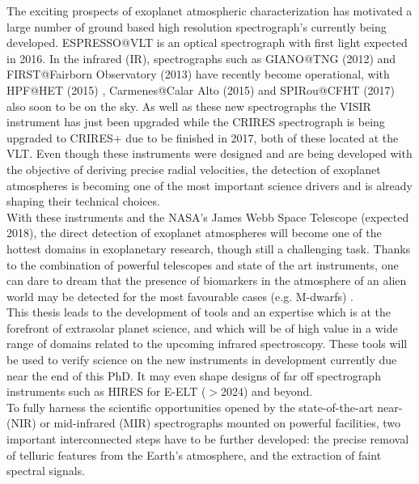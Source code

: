 \documentclass[pdftex,12pt,a4paper]{article}
\begin{document}
The exciting prospects of exoplanet atmospheric characterization has motivated a large number of ground based high resolution spectrograph's currently being developed. ESPRESSO@VLT \citep{Pepe2010} is an optical spectrograph with first light expected in 2016. In the infrared (IR), spectrographs such as GIANO@TNG (2012) and FIRST@Fairborn Observatory (2013) \citep{FIRST2013}  have recently become operational, with HPF@HET (2015) \citep{Mahadevan2012}, Carmenes@Calar Alto (2015) and SPIRou@CFHT (2017) also soon to be on the sky. As well as these new spectrographs the VISIR instrument has just been upgraded while the CRIRES spectrograph is being upgraded to CRIRES+ due to be finished in 2017, both of these located at the VLT. Even though these instruments were designed and are being developed with the objective of deriving precise radial velocities, the detection of exoplanet atmospheres is becoming one of the most important science drivers and is already shaping their technical choices. \\

With these instruments and the NASA's James Webb Space Telescope (expected 2018), the direct detection of exoplanet atmospheres will become one of the hottest domains in exoplanetary research, though still a challenging task. Thanks to the combination of powerful telescopes and state of the art instruments, one can dare to dream that the presence of biomarkers in the atmosphere of an alien world may be detected for the most favourable cases (e.g. M-dwarfs) \citep{Palle2011}. \\

This thesis leads to the development of tools and an expertise which is at the forefront of extrasolar planet science, and which will be of high value in a wide range of domains related to the upcoming infrared spectroscopy. These tools will be used to verify science on the new instruments in development currently due near the end of this PhD. It may even shape designs of far off spectrograph instruments such as HIRES for E-ELT ($>$2024) and beyond.\\

To fully harness the scientific opportunities opened by the state-of-the-art near- (NIR) or mid-infrared (MIR) spectrographs mounted on powerful facilities, two important interconnected steps have to be further developed: the precise removal of telluric features from the Earth's atmosphere, and the extraction of faint spectral signals.\\
\end{document}
